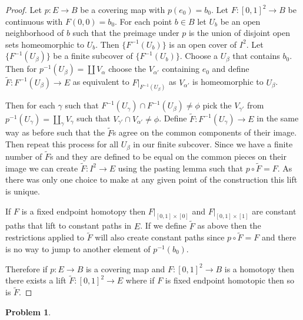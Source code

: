 \documentclass[10pt]{article}
\newcommand{\sk}{\vskip 10mm}
\theoremstyle{plain}
\newtheorem{problem}{Problem}
\theoremstyle{remark}
\begin{document}
\begin{proof}
  Let $p:E\rightarrow B$ be a covering map with $p(e_0)=b_0$. Let $F:[0,1]^2\rightarrow B$ be continuous
  with $F(0,0)=b_0$. For each point $b\in B$ let $U_b$ be an open neighborhood of $b$ such
  that the preimage under $p$ is the union of disjoint open sets homeomorphic to $U_b$. 
  Then $\{F^{-1}(U_b)\}$ is an open cover of $I^2$. Let $\{F^{-1}(U_\beta)\}$ be a finite subcover
  of $\{F^{-1}(U_b)\}$. Choose a $U_\beta$ that contains $b_0$. Then for
  $p^{-1}(U_\beta)=\coprod V_\alpha$ choose the $V_{\alpha'}$ containing $e_0$ and define
  $\tilde{F}:F^{-1}(U_\beta)\rightarrow E$ as equivalent to $F|_{F^{-1}(U_\beta)}$ as $V_{\alpha'}$ is homeomorphic
  to $U_\beta$.

  Then for each $\gamma$ such that $F^{-1}(U_\gamma)\cap F^{-1}(U_\beta)\neq \phi$  pick the $V_{\gamma'}$ from
  $p^{-1}(U_\gamma)=\coprod_\gamma V_\gamma$ such that $V_{\gamma'}\cap V_{\alpha'}\neq \phi$. Define $\tilde{F}:F^{-1}(U_\gamma)\rightarrow E$ in
  the same way as before such that the $\tilde{F}$s agree on the common components of their
  image. Then repeat this process for all $U_\beta$ in our finite subcover.
  Since we have a finite number of $\tilde{F}$s and they are defined to be equal on
  the common pieces on their image we can create $\tilde{F}:I^2\rightarrow E$ using the pasting
  lemma such that $p\circ \tilde{F}=F$. As there was only one choice to make at any given
  point of the construction this lift is unique.

  If $F$ is a fixed endpoint homotopy then $F|_{[0,1]\times [0]}$ and $F|_{[0,1]\times [1]}$
  are constant paths that lift to constant paths in $E$. If we define $\tilde{F}$
  as above then the restrictions applied to $\tilde{F}$ will also create constant
  paths since $p\circ\tilde{F}=F$ and there is no way to jump to another element
  of $p^{-1}(b_0)$.

  Therefore if $p:E\rightarrow B$ is a covering map and $F:[0,1]^2\rightarrow B$ is a homotopy then
  there exists a lift $\tilde{F}:[0,1]^2\rightarrow E$ where if $F$ is fixed endpoint homotopic
  then so is $\tilde{F}$.
\end{proof}

\sk

\begin{problem} %
  
\end{problem}
\end{document}
